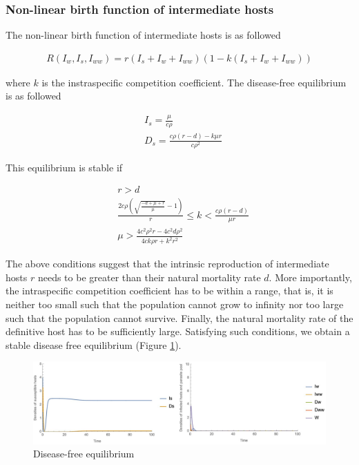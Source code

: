\documentclass{article}
\begin{document}
\subsubsection{Non-linear birth function of intermediate hosts}
The non-linear birth function of intermediate hosts is as followed

\begin{align*}
R(I_w, I_s,I_{ww}) = r (I_s + I_w + I_{ww}) (1 - k (I_s + I_w + I_{ww}))
\end{align*}

where $k$ is the instraspecific competition coefficient. The disease-free equilibrium is as followed

\begin{align*}
& I_s = \frac{\mu}{c \rho } \\
& D_s = \frac{c \rho  (r-d) - k \mu  r}{c \rho ^2}
\end{align*}

This equilibrium is stable if

\begin{align*}
& r > d \\
& \frac{2 c \rho  \left(\sqrt{\frac{-d+\mu +r}{\mu }}-1\right)}{r}\leq k < \frac{c \rho  (r-d)}{\mu  r} \\
& \mu >\frac{4 c^2 \rho ^2 r - 4 c^2 d \rho ^2}{4 c k \rho r + k^2 r^2}
\end{align*}

The above conditions suggest that the intrinsic reproduction of intermediate hosts $r$ needs to be greater than their natural mortality rate $d$. More importantly, the intraspecific competition coefficient has to be within a range, that is, it is neither too small such that the population cannot grow to infinity nor too large such that the population cannot survive. Finally, the natural mortality rate of the definitive host has to be sufficiently large. Satisfying such conditions, we obtain a stable disease free equilibrium (Figure \ref{fig:diseasefree:nonlinear}).

\begin{figure}
\includegraphics[width=\textwidth]{Figures/diseasefree_nonlinear}
\caption{Disease-free equilibrium}
\label{fig:diseasefree:nonlinear}
\end{figure}
\end{document}
